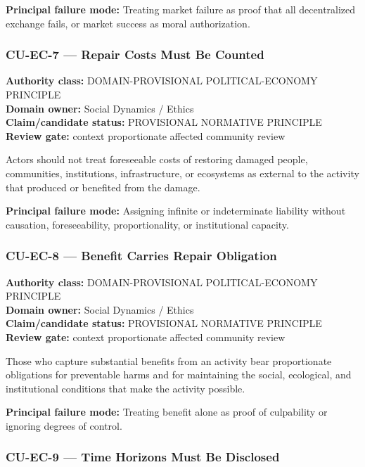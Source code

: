 \documentclass[
  11pt,
]{article}
\begin{document}
\textbf{Principal failure mode:} Treating market failure as proof that
all decentralized exchange fails, or market success as moral
authorization.

\subsubsection{CU-EC-7 --- Repair Costs Must Be
Counted}\label{cu-ec-7-repair-costs-must-be-counted}

\textbf{Authority class:} DOMAIN-PROVISIONAL POLITICAL-ECONOMY
PRINCIPLE\\
\textbf{Domain owner:} Social Dynamics / Ethics\\
\textbf{Claim/candidate status:} PROVISIONAL NORMATIVE PRINCIPLE\\
\textbf{Review gate:} context proportionate affected community review

Actors should not treat foreseeable costs of restoring damaged people,
communities, institutions, infrastructure, or ecosystems as external to
the activity that produced or benefited from the damage.

\textbf{Principal failure mode:} Assigning infinite or indeterminate
liability without causation, foreseeability, proportionality, or
institutional capacity.

\subsubsection{CU-EC-8 --- Benefit Carries Repair
Obligation}\label{cu-ec-8-benefit-carries-repair-obligation}

\textbf{Authority class:} DOMAIN-PROVISIONAL POLITICAL-ECONOMY
PRINCIPLE\\
\textbf{Domain owner:} Social Dynamics / Ethics\\
\textbf{Claim/candidate status:} PROVISIONAL NORMATIVE PRINCIPLE\\
\textbf{Review gate:} context proportionate affected community review

Those who capture substantial benefits from an activity bear
proportionate obligations for preventable harms and for maintaining the
social, ecological, and institutional conditions that make the activity
possible.

\textbf{Principal failure mode:} Treating benefit alone as proof of
culpability or ignoring degrees of control.

\subsubsection{CU-EC-9 --- Time Horizons Must Be
Disclosed}\label{cu-ec-9-time-horizons-must-be-disclosed}
\end{document}
